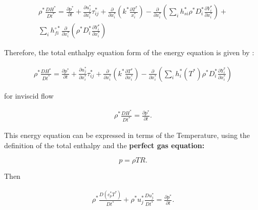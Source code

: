\begin{equation*}
\begin{split}
\rho^*
\frac{D H^*}{D t^*}
=
\frac{\partial p^*}{\partial t} 
+
\frac{\partial u_j^*}{\partial x^*_i}
\tau_{ij}^*
+
\frac{\partial}{\partial x_i^*}
\left(
    k^*\frac{\partial T^*}{x_i^*}
\right)
-
\frac{\partial}{\partial x_i^*}
\left(
        \sum_i
        h_{si}^*
        \rho^*
        D_i^*
        \frac{\partial Y_i^*}{\partial x_i^*}
\right)
+
\\
\sum_i  
h_{fi}^{\circ*}
\frac{\partial }{\partial x_i^*}
\left(
    \rho^*D_i^*
    \frac{\partial Y_i^* }{\partial x_i^*}
\right)
\end{split}
\end{equation*} 


Therefore, the total enthalpy equation form 
of the energy equation is given by :

\begin{equation*}
\begin{split}
\rho^*
\frac{D H^*}{D t^*}
=
\frac{\partial p^*}{\partial t} 
+
\frac{\partial u_j^*}{\partial x^*_i}
\tau_{ij}^*
+
\frac{\partial}{\partial x_i^*}
\left(
    k^*\frac{\partial T^*}{\partial x_i^*}
\right)
-
\frac{\partial}{\partial x_i^*}
\left(
        \sum_i
        h_i^*(T^*)
        \rho^*
        D_i^*
        \frac{\partial Y_i^*}{\partial x_i^*}
\right)
\end{split}
\end{equation*} 

for inviscid flow

\begin{equation*}
\begin{split}
\rho^*
\frac{D H^*}{D t^*}
=
\frac{\partial p^*}{\partial t} 
.
\end{split}
\end{equation*} 

This energy equation can be expressed in terms 
of the Temperature, using the definition of the total enthalpy 
and the  \textbf{perfect gas equation:}

\begin{equation} 
p=\rho T R.
\end{equation} 

Then 

\begin{equation*}
\begin{split}
\rho^*
\frac{D (c_p^*T^*)}{D t^*}
+
\rho^*
u_j^*
\frac{D u_j^*}{D t^*}
=
\frac{\partial p^*}{\partial t} 
.
\end{split}
\end{equation*} 

